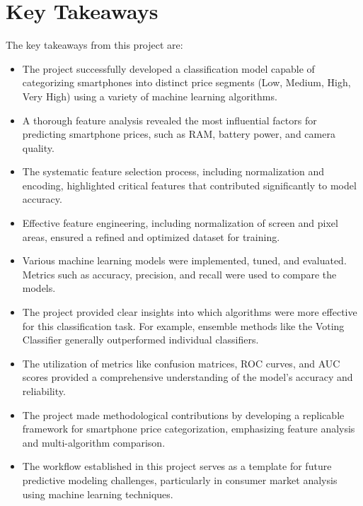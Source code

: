 \documentclass[12pt]{report}
\begin{document}
\section{Key Takeaways}
The key takeaways from this project are:
\vspace{-1.25em}
\begin{itemize}
	\setlength\itemsep{-1.05em}
	\item The project successfully developed a classification model capable of categorizing smartphones into distinct price segments (Low, Medium, High, Very High) using a variety of machine learning algorithms.
	\item A thorough feature analysis revealed the most influential factors for predicting smartphone prices, such as RAM, battery power, and camera quality.
	\item The systematic feature selection process, including normalization and encoding, highlighted critical features that contributed significantly to model accuracy.
	\item Effective feature engineering, including normalization of screen and pixel areas, ensured a refined and optimized dataset for training.
	\item Various machine learning models were implemented, tuned, and evaluated. Metrics such as accuracy, precision, and recall were used to compare the models.
	\item The project provided clear insights into which algorithms were more effective for this classification task. For example, ensemble methods like the Voting Classifier generally outperformed individual classifiers.
	\item The utilization of metrics like confusion matrices, ROC curves, and AUC scores provided a comprehensive understanding of the model’s accuracy and reliability.
	\item The project made methodological contributions by developing a replicable framework for smartphone price categorization, emphasizing feature analysis and multi-algorithm comparison.
	\item The workflow established in this project serves as a template for future predictive modeling challenges, particularly in consumer market analysis using machine learning techniques.
\end{itemize}
\end{document}
